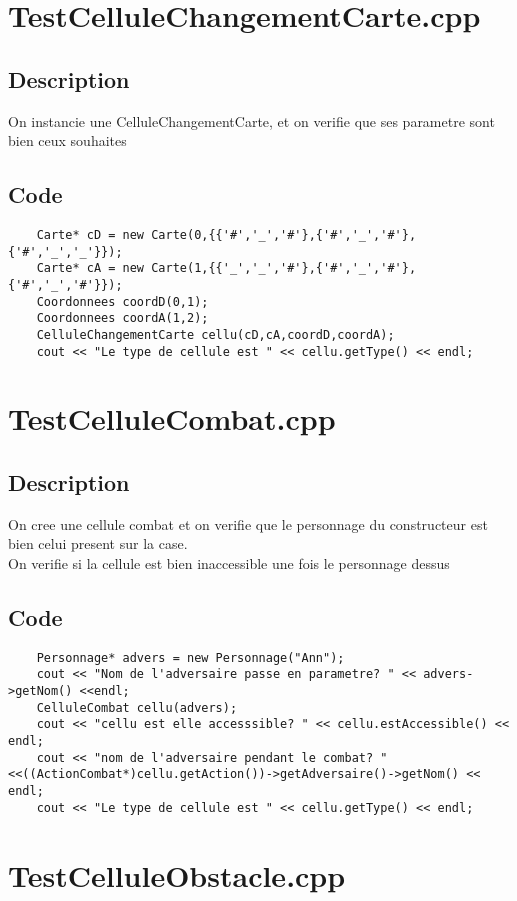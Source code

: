     \section{TestCelluleChangementCarte.cpp}
        \subsection{Description}
            On instancie une CelluleChangementCarte, et on verifie que ses parametre sont bien ceux souhaites
        \subsection{Code}
\begin{lstlisting}
	Carte* cD = new Carte(0,{{'#','_','#'},{'#','_','#'},{'#','_','_'}});
	Carte* cA = new Carte(1,{{'_','_','#'},{'#','_','#'},{'#','_','#'}});
	Coordonnees coordD(0,1);
	Coordonnees coordA(1,2);
	CelluleChangementCarte cellu(cD,cA,coordD,coordA);
	cout << "Le type de cellule est " << cellu.getType() << endl;
	\end{lstlisting}
    \section{TestCelluleCombat.cpp}
        \subsection{Description}
            On cree une cellule combat et on verifie que le personnage du constructeur est bien celui present sur la case.\\
            On verifie si la cellule est bien inaccessible une fois le personnage dessus
        \subsection{Code}
\begin{lstlisting}
	Personnage* advers = new Personnage("Ann");
	cout << "Nom de l'adversaire passe en parametre? " << advers->getNom() <<endl;
	CelluleCombat cellu(advers);
	cout << "cellu est elle accesssible? " << cellu.estAccessible() << endl;
	cout << "nom de l'adversaire pendant le combat? " <<((ActionCombat*)cellu.getAction())->getAdversaire()->getNom() << endl;
	cout << "Le type de cellule est " << cellu.getType() << endl;
	\end{lstlisting}
    \section{TestCelluleObstacle.cpp}
